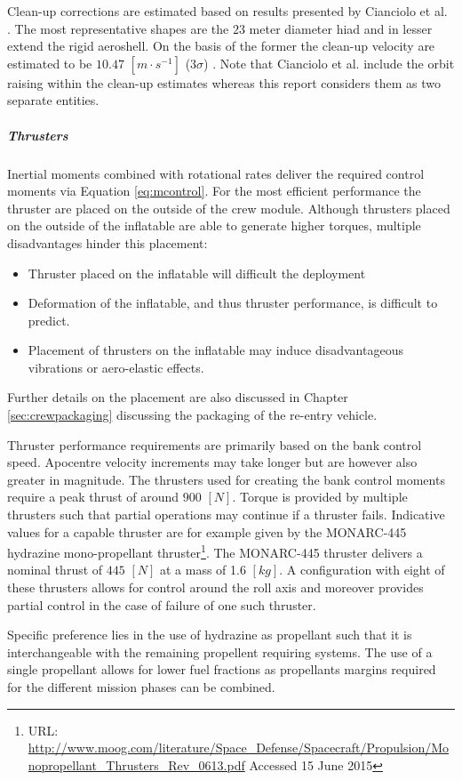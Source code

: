 Clean-up corrections are estimated based on results presented by Cianciolo et al. \cite{Cianciolo2010}. The most representative shapes are the $23$ meter diameter \gls{hiad} and in lesser extend the rigid aeroshell. On the basis of the former the clean-up velocity are estimated to be $10.47$ $[m\cdot s^{-1}]$ ($3\sigma$) \cite[p.37]{Cianciolo2010}. Note that Cianciolo et al. include the orbit raising within the clean-up estimates whereas this report considers them as two separate entities.


\subparagraph{Thrusters}
Inertial moments combined with rotational rates deliver the required control moments via Equation \ref{eq:mcontrol}. For the most efficient performance the thruster are placed on the outside of the crew module. Although thrusters placed on the outside of the inflatable are able to generate higher torques, multiple disadvantages hinder this placement:
\begin{itemize}
\item Thruster placed on the inflatable will difficult the deployment
\item Deformation of the inflatable, and thus thruster performance, is difficult to predict.
\item Placement of thrusters on the inflatable may induce disadvantageous vibrations or aero-elastic effects.  
\end{itemize} 

Further details on the placement are also discussed in Chapter \ref{sec:crewpackaging} discussing the packaging of the re-entry vehicle.

Thruster performance requirements are primarily based on the bank control speed. Apocentre velocity increments may take longer but are however also greater in magnitude. The thrusters used for creating the bank control moments require a peak thrust of around $900$ $[N]$. Torque is provided by multiple thrusters such that partial operations may continue if a thruster fails.
Indicative values for a capable thruster are for example given by the  MONARC-445 hydrazine mono-propellant thruster\footnote{URL: \url{http://www.moog.com/literature/Space\_Defense/Spacecraft/Propulsion/Monopropellant\_Thrusters\_Rev\_0613.pdf} Accessed 15 June 2015}. The MONARC-445 thruster delivers a nominal thrust of $445$ $[N]$ at a mass of 1.6 $[kg]$.  A configuration with eight of these thrusters allows for control around the roll axis and moreover provides partial control in the case of failure of one such thruster.
 
Specific preference lies in the use of hydrazine as propellant such that it is interchangeable with the remaining propellent requiring systems. The use of a single propellant allows for lower fuel fractions as propellants margins required for the different mission phases can be combined.

